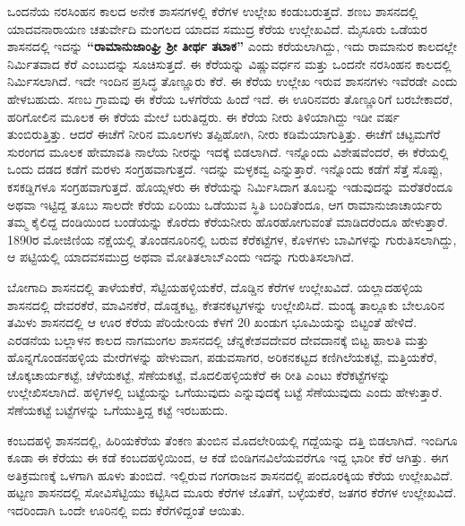 ಒಂದನೆಯ ನರಸಿಂಹನ ಕಾಲದ ಅನೇಕ ಶಾಸನಗಳಲ್ಲಿ ಕೆರೆಗಳ ಉಲ್ಲೇಖ ಕಂಡುಬರುತ್ತದೆ. ಶಣಬ ಶಾಸನದಲ್ಲಿ ಯಾದವನಾರಾಯಣ ಚತುರ್ವೇದಿ ಮಂಗಲದ ಯಾದವ ಸಮುದ್ರ ಕೆರೆಯ ಉಲ್ಲೇಖವಿದೆ. ಮೈಸೂರು ಒಡೆಯರ ಶಾಸನದಲ್ಲಿ ಇದನ್ನು \textbf{“ರಾಮಾನುಜಾಂಘ್ರಿ ಶ‍್ರೀ ತೀರ್ಥ ತಟಾಕ”} ಎಂದು ಕರೆಯಲಾಗಿದ್ದು, ಇದು ರಾಮಾನುರ ಕಾಲದಲ್ಲೇ ನಿರ್ಮಿತವಾದ ಕೆರೆ ಎಂಬುದನ್ನು ಸೂಚಿಸುತ್ತದೆ. ಈ ಕೆರೆಯನ್ನು ವಿಷ್ಣುವರ್ಧನ ಮತ್ತು ಒಂದನೇ ನರಸಿಂಹನ ಕಾಲದಲ್ಲಿ ನಿರ್ಮಿಸಲಾಗಿದೆ. ಇದೇ ಇಂದಿನ ಪ್ರಸಿದ್ಧ ತೊಣ್ಣೂರು ಕೆರೆ. ಈ ಕೆರೆಯ ಉಲ್ಲೇಖ ಇರುವ ಶಾಸನಗಳು ಇವೆರಡೇ ಎಂದು ಹೇಳಬಹುದು. ಸಣಬ ಗ್ರಾಮವು ಈ ಕೆರೆಯ ಒಳಗೆರೆಯ ಹಿಂದೆ ಇದೆ. ಈ ಊರಿನವರು ತೊಣ್ಣೂರಿಗೆ ಬರಬೇಕಾದರೆ, ಹರಿಗೋಲಿನ ಮೂಲಕ ಈ ಕೆರೆಯ ಮೇಲೆ ಬರುತಿದ್ದರು. ಈ ಕೆರೆಯ ನೀರು ತಿಳಿಯಾಗಿದ್ದು ಇಡೀ ವರ್ಷ ತುಂಬಿರುತ್ತಿತ್ತು. ಆದರೆ ಈಚೆಗೆ ನೀರಿನ ಮೂಲಗಳು ತಪ್ಪಿಹೋಗಿ, ನೀರು ಕಡಿಮೆಯಾಗುತ್ತಿತ್ತು. ಈಚೆಗೆ ಚಟ್ಟಮಗೆರೆ ಸುರಂಗದ ಮೂಲಕ ಹೇಮಾವತಿ ನಾಲೆಯ ನೀರನ್ನು ಇದಕ್ಕೆ ಬಿಡಲಾಗಿದೆ. ಇನ್ನೊಂದು ವಿಶೇಷವೆಂದರೆ, ಈ ಕೆರೆಯಲ್ಲಿ ಒಂದು ದಡದ ಕಡೆಗೆ ಮರಳು ಸಂಗ್ರಹವಾಗುತ್ತದೆ. ಇದನ್ನು ಮಳ್ಳಕವ್ವ ಎನ್ನುತ್ತಾರೆ. ಇನ್ನೊಂದು ಕಡೆಗೆ ಸೆತ್ತೆ ಸೊಪ್ಪು, ಕಸಕಡ್ಡಿಗಳೂ ಸಂಗ್ರಹವಾಗುತ್ತದೆ. ಹೊಯ್ಸಳರು ಈ ಕೆರೆಯನ್ನು ನಿರ್ಮಿಸಿದಾಗ ತೂಬನ್ನು ಇಡುವುದನ್ನು ಮರೆತರೆಂದೂ ಅಥವಾ ಇಟ್ಟಿದ್ದ ತೂಬು ಸಾಲದೇ ಕೆರೆಯ ಏರಿಯು ಒಡೆಯುವ ಸ್ಥಿತಿ ಬಂದಿತೆಂದೂ, ಆಗ ರಾಮಾನುಜಾಚಾರ್ಯರು ತಮ್ಮ ಕೈಲಿದ್ದ ದಂಡಿಯಿಂದ ಬಂಡೆಯನ್ನು ಕೊರೆದು ಕೆರೆಯನೀರು ಹೊರಹೋಗುವಂತೆ ಮಾಡಿದರೆಂದೂ ಹೇಳುತ್ತಾರೆ. 1890ರ ಮೋಜಿಣಿಯ ನಕ್ಷೆಯಲ್ಲಿ ತೊಂಡನೂರಿನಲ್ಲಿ ಬರುವ ಕೆರೆಕಟ್ಟೆಗಳ, ಕೊಳಗಳು ಬಾವಿಗಳನ್ನು ಗುರುತಿಸಲಾಗಿದ್ದು, ಆ ಪಟ್ಟಿಯಲ್ಲಿ ಯಾದವಸಮುದ್ರ ಅಥವಾ ಮೋತಿತಲಾಬ್​ ಎಂದು ಇದನ್ನು ಗುರುತಿಸಲಾಗಿದೆ.

ಬೋಗಾದಿ ಶಾಸನದಲ್ಲಿ ತಾಳೆಯಕೆರೆ, ಸೆಟ್ಟಿಯಹಳ್ಳಿಯಕೆರೆ, ದೊಡ್ಡಿನ ಕೆರೆಗಳ ಉಲ್ಲೇಖವಿದೆ. ಯಲ್ಲಾದಹಳ್ಳಿಯ ಶಾಸನದಲ್ಲಿ ದೇವರಕೆರೆ, ಮಾವಿನಕೆರೆ, ದೊಡ್ಡಕಟ್ಟ, ಕೇತನಕಟ್ಟಗಳನ್ನು ಉಲ್ಲೇಖಿಸಿದೆ. ಮಂಡ್ಯ ತಾಲ್ಲೂಕು ಬೇಲೂರಿನ ತಮಿಳು ಶಾಸನದಲ್ಲಿ ಆ ಊರ ಕೆರೆಯ ಪೆರಿಯೇರಿಯ ಕೆಳಗೆ 20 ಖಂಡುಗ ಭೂಮಿಯನ್ನು ಬಿಟ್ಟಂತೆ ಹೇಳಿದೆ. ಎರಡನೆಯ ಬಲ್ಲಾಳನ ಕಾಲದ ನಾಗಮಂಗಲ ಶಾಸನದಲ್ಲಿ ಚೆನ್ನಕೇಶವದೇವರ ದೇವದಾನಕ್ಕೆ ಬಿಟ್ಟ ಹಾಲತಿ ಮತ್ತು ಹೊನ್ನಗೊಂಡನಹಳ್ಳಿಯ ಮೇರೆಗಳನ್ನು ಹೇಳುವಾಗ, ಪಡುವಸಾಗರ, ಅರಿಕನಕಟ್ಟದ ಕಣಿಗಿಲೆಯಕಟ್ಟೆ, ಮತ್ತಿಯಕೆರೆ, ಚೊಕ್ಕಚಾರ್ಯಕಟ್ಟೆ, ಚೆಳೆಯಕಟ್ಟೆ, ಸೆಣೆಯಕಟ್ಟೆ, ಮೊದಲಿಹಳ್ಳಿಯಕೆರೆ ಈ ರೀತಿ ಎಂಟು ಕೆರೆಕಟ್ಟೆಗಳನ್ನು ಉಲ್ಲೇಖಿಸಲಾಗಿದೆ. ಹಳ್ಳಿಗಳಲ್ಲಿ ಬಟ್ಟೆಯನ್ನು ಒಗೆಯುವುದು ಎನ್ನುವುದಕ್ಕೆ ಬಟ್ಟೆ ಸೆಣೆಯುವುದು ಎಂದು ಹೇಳುತ್ತಾರೆ. ಸೆಣೆಯಕಟ್ಟೆ ಬಟ್ಟೆಗಳನ್ನು ಒಗೆಯುತ್ತಿದ್ದ ಕಟ್ಟೆ ಇರಬಹುದು.

ಕಂಬದಹಳ್ಳಿ ಶಾಸನದಲ್ಲಿ, ಹಿರಿಯಕೆರೆಯ ತೆಂಕಣ ತುಂಬಿನ ಮೊದಲೇರಿಯಲ್ಲಿ ಗದ್ದೆಯನ್ನು ದತ್ತಿ ಬಿಡಲಾಗಿದೆ. ಇಂದಿಗೂ ಕೂಡಾ ಈ ಕೆರೆಯು ಈ ಕಡೆ ಕಂಬದಹಳ್ಳಿಯಿಂದ, ಆ ಕಡೆ ಬಿಂಡಿಗನವಿಲೆಯವರೆಗೂ ಇದ್ದ ಭಾರೀ ಕೆರೆ ಆಗಿತ್ತು. ಈಗ ಅತಿಕ್ರಮಣಕ್ಕೆ ಒಳಗಾಗಿ ಹೂಳು ತುಂಬಿದೆ. ಇಲ್ಲಿರುವ ಗಂಗರಾಜನ ಶಾಸನದಲ್ಲಿ ಪಂದೂರಕ್ಕಿಯ ಕೆರೆಯ ಉಲ್ಲೇಖವಿದೆ. ಹಟ್ಟಣ ಶಾಸನದಲ್ಲಿ ಸೋವಿಸೆಟ್ಟಿಯು ಕಟ್ಟಿಸಿದ ಮೂರು ಕೆರೆಗಳ ಜೊತೆಗೆ, ಬಳ್ಳೆಯಕೆರೆ, ಜತಗರ ಕೆರೆಗಳ ಉಲ್ಲೇಖವಿದೆ. ಇದರಿಂದಾಗಿ ಒಂದೇ ಊರಿನಲ್ಲಿ ಐದು ಕೆರೆಗಳಿದ್ದಂತೆ ಆಯಿತು.

